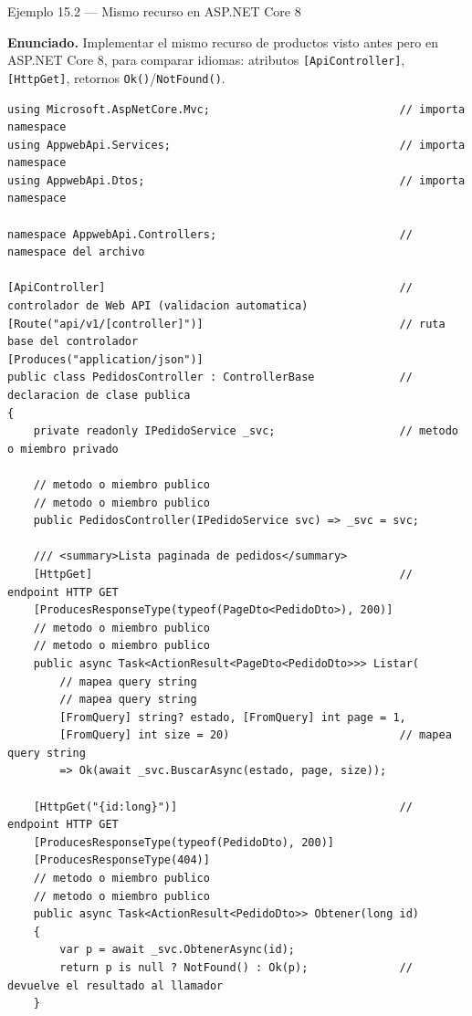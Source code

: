 \documentclass[11pt,a4paper,openany]{book}
\begin{document}
\begin{cajaejemplo}{Ejemplo 15.2 --- Mismo recurso en ASP.NET Core 8}

\textbf{Enunciado.} Implementar el mismo recurso de productos visto antes pero en ASP.NET Core 8, para comparar idiomas: atributos \texttt{[ApiController]}, \texttt{[HttpGet]}, retornos \texttt{Ok()}/\texttt{NotFound()}.

\begin{lstlisting}[style=cs,caption={PedidosController.cs},label=lst:15.4]
using Microsoft.AspNetCore.Mvc;                             // importa namespace
using AppwebApi.Services;                                   // importa namespace
using AppwebApi.Dtos;                                       // importa namespace

namespace AppwebApi.Controllers;                            // namespace del archivo

[ApiController]                                             // controlador de Web API (validacion automatica)
[Route("api/v1/[controller]")]                              // ruta base del controlador
[Produces("application/json")]
public class PedidosController : ControllerBase             // declaracion de clase publica
{
    private readonly IPedidoService _svc;                   // metodo o miembro privado

    // metodo o miembro publico
    // metodo o miembro publico
    public PedidosController(IPedidoService svc) => _svc = svc;

    /// <summary>Lista paginada de pedidos</summary>
    [HttpGet]                                               // endpoint HTTP GET
    [ProducesResponseType(typeof(PageDto<PedidoDto>), 200)]
    // metodo o miembro publico
    // metodo o miembro publico
    public async Task<ActionResult<PageDto<PedidoDto>>> Listar(
        // mapea query string
        // mapea query string
        [FromQuery] string? estado, [FromQuery] int page = 1,
        [FromQuery] int size = 20)                          // mapea query string
        => Ok(await _svc.BuscarAsync(estado, page, size));

    [HttpGet("{id:long}")]                                  // endpoint HTTP GET
    [ProducesResponseType(typeof(PedidoDto), 200)]
    [ProducesResponseType(404)]
    // metodo o miembro publico
    // metodo o miembro publico
    public async Task<ActionResult<PedidoDto>> Obtener(long id)
    {
        var p = await _svc.ObtenerAsync(id);
        return p is null ? NotFound() : Ok(p);              // devuelve el resultado al llamador
    }


\end{lstlisting}
\end{cajaejemplo}
\end{document}

